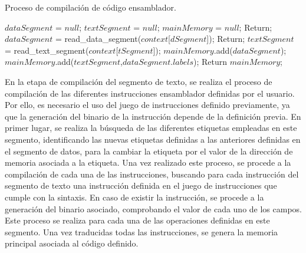 \begin{algorithm}[h]
	\caption{Proceso de compilación de código \gls{ensamblador}.}
	\label{alg:assembly_compiler_pseudocode}
  	\scriptsize
	\begin{algorithmic}[1]
		\State $dataSegment$ = $null$;
		\State $textSegment$ = $null$;
		\State $mainMemory$ = $null$;
			\State Return;
		\EndIf
		\State $dataSegment$ = read\_data\_segment($context$[$dSegment$]);
			\State Return;
		\EndIf
		\State $textSegment$ = read\_text\_segment($context$[$tSegment$]);
		\State $mainMemory$.add($dataSegment$);
		\State $mainMemory$.add($textSegment$,$dataSegment$.$labels$);
		\State Return $mainMemory$;
		\EndFunction
\end{algorithmic}
\end{algorithm}

En la etapa de compilación del segmento de texto, se realiza el proceso de compilación de las diferentes instrucciones \gls{ensamblador} definidas por el usuario. Por ello, es necesario el uso del juego de instrucciones definido previamente, ya que la generación del binario de la instrucción depende de la definición previa. En primer lugar, se realiza la búsqueda de las diferentes etiquetas empleadas en este segmento, identificando las nuevas etiquetas definidas a las anteriores definidas en el segmento de datos, para la cambiar la etiqueta por el valor de la dirección de memoria asociada a la etiqueta. Una vez realizado este proceso, se procede a la compilación de cada una de las instrucciones, buscando para cada instrucción del segmento de texto una instrucción definida en el juego de instrucciones que cumple con la sintaxis. En caso de existir la instrucción, se procede a la generación del binario asociado, comprobando el valor de cada uno de los campos. Este proceso se realiza para cada una de las operaciones definidas en este segmento. Una vez traducidas todas las instrucciones, se genera la memoria principal asociada al código definido.

